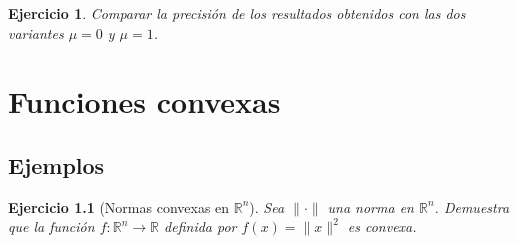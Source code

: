 \documentclass[11pt]{report}
\newtheorem{ex}{Ejercicio}
\newenvironment{solucion}{\color{blue}\textbf{Solución:}}{}
\begin{document}
\begin{ex}
Comparar la precisión de los resultados obtenidos con las dos variantes $\mu=0$ y $\mu=1$.
\end{ex}




\chapter{Funciones convexas}

\section{Ejemplos}




\begin{ex}[Normas convexas en $\mathbb{R}^n$]
    Sea $\|\cdot\|$ una norma en $\mathbb{R}^n$. Demuestra que la función $f: \mathbb{R}^n \to \mathbb{R}$ definida por $f(x) = \|x\|^2$ es convexa.
\end{ex}

\end{document}
